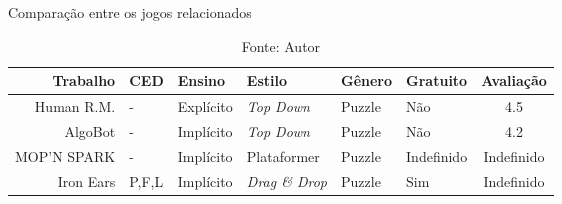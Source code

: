 \begin{table}[H]
	\caption{Comparação entre os jogos relacionados}
	\label{tab:cmp_jogos_relatos}
	\centering
	\footnotesize
	\begin{tabular}{r|lllllc}
		\toprule
		\textbf{Trabalho}      & \textbf{CED}         & \textbf{Ensino}    & \textbf{Estilo}      & \textbf{Gênero}   & \textbf{Gratuito} & \textbf{Avaliação}  \\
		\midrule
		Human R.M.             & -                   & Explícito          & \emph{Top Down}       & Puzzle            & Não               & 4.5 \\
    AlgoBot                & -                   & Implícito          & \emph{Top Down}       & Puzzle            & Não               & 4.2 \\
		MOP'N SPARK            & -                   & Implícito          & Plataformer           & Puzzle            & Indefinido        & Indefinido \\
    Iron Ears              & P,F,L               & Implícito          & \emph{Drag \& Drop}   & Puzzle            & Sim               & Indefinido \\
		\bottomrule
	\end{tabular}
	\caption*{Fonte: Autor}
\end{table}

